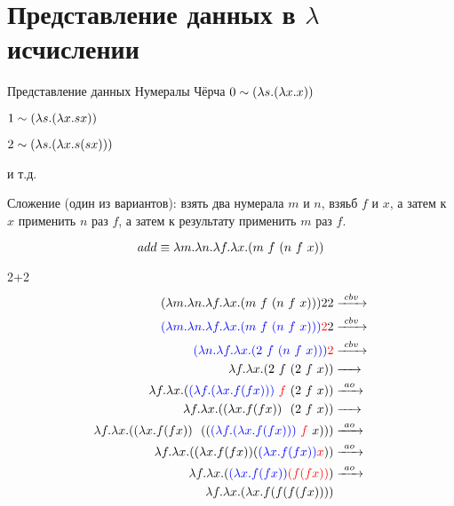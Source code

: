 \section{Представление данных в $\lambda$ исчислении}
\begin{frame}{Представление данных}
  Нумералы Чёрча
$ 0 \sim (\lambda s . (\lambda x . x))$

$ 1 \sim (\lambda s . (\lambda x . sx))$

$ 2 \sim (\lambda s . (\lambda x . s(sx)))$

и т.д.
\vspace{1cm}

Сложение (один из вариантов): взять два нумерала $m$ и $n$, взяьб $f$ и $x$, а затем к $x$ применить $n$ раз $f$, а затем к результату применить $m$ раз $f$.

\[
add \equiv \lambda m. \lambda n. \lambda f. \lambda x. (m\ f\  (n\ f\  x))
\]
\end{frame}
\newcommand{\tb}[1]{\textcolor{blue}{#1}}
\newcommand{\tr}[1]{\textcolor{red}{#1}}
\begin{frame}{2+2}
  \begin{align*}
    (\lambda m. \lambda n. \lambda f. \lambda x. \app{m\ f\ }{\app{n\ f\ }{x}}){} 2 2 &\cbv \\
    \textcolor{blue}{(\lambda m. \lambda n. \lambda f. \lambda x. \app{m\ f\ }{\app{n\ f\ }{x}}) {}} \textcolor{red}{2} 2 &\cbv \\
    \textcolor{blue}{( \lambda n. \lambda f. \lambda x. \app{2\ f\ }{\app{n\ f\ }{x}}){}} \textcolor{red}{2} & \cbv \\
    \lambda f. \lambda x. \app{2\ f\ }{\app{2\ f\ }{x}}   &\xarr{\ \ } \\
    \lambda f. \lambda x. \app{\tb{\lam{f}{\lam{x}{f (f x)}}} \ \tr{f}\ }{\app{2\ f\ }{x}} &\ao \\
    \lambda f. \lambda x. \app{\lam{x}{f (f x)} \ \ }{\app{2\ f\ }{x}} &\xarr{\ \ } \\
    \lambda f. \lambda x. \app{\lam{x}{f (f x)} \ \ } {\app{\app{\tb{\lam{f}{\lam{x}{f (f x)}}}\ \tr{f}\ }{x}}} &\ao \\
    \lambda f. \lambda x. \app{\lam{x}{f (f x)}  } {\app{\tb{\lam{x}{f (f x)} } }{\tr{x}}} &\ao \\
    \lambda f. \lambda x. \app{\tb{\lam{x}{f (f x)} } } {\tr{(f (f x))}} &\ao \\
    \lambda f. \lambda x. \lam{x}{f (f (f (f x)))} &
  \end{align*}
\end{frame}


